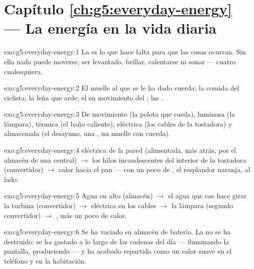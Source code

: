 \section*{Capítulo \ref{ch:g5:everyday-energy} --- La energía en la vida diaria}

\begin{solution}{exo:g5:everyday-energy:1}
La  es lo que hace falta para que las cosas ocurran. Sin
ella nada puede moverse, ser levantado, brillar, calentarse ni
sonar --- cuatro cualesquiera.
\end{solution}

\begin{solution}{exo:g5:everyday-energy:2}
El muelle al que se le ha dado cuerda; la comida del ciclista; la leña
que arde; el  en movimiento del ; las .
\end{solution}

\begin{solution}{exo:g5:everyday-energy:3}
De movimiento (la pelota que rueda), luminosa (la lámpara), térmica
(el baño caliente), eléctrica (los cables de la tostadora) y
almacenada (el desayuno, una , un muelle con cuerda).
\end{solution}

\begin{solution}{exo:g5:everyday-energy:4}
 eléctrica de la pared (alimentada, más atrás, por el
almacén de una central) $\to$ los hilos incandescentes del interior de
la tostadora (convertidor) $\to$ calor hacia el pan --- con un poco de
, el resplandor naranja, al lado.
\end{solution}

\begin{solution}{exo:g5:everyday-energy:5}
Agua en alto (almacén) $\to$ el agua que cae hace girar la turbina
(convertidor) $\to$  eléctrica en los cables $\to$ la lámpara
(segundo convertidor) $\to$ , más un poco de calor.
\end{solution}

\begin{solution}{exo:g5:everyday-energy:6}
Se ha vaciado su almacén de batería. La  no se ha destruido:
se ha gastado a lo largo de las cadenas del día --- iluminando la
pantalla, produciendo  --- y ha acabado repartida como un calor
suave en el teléfono y en la habitación.
\end{solution}

